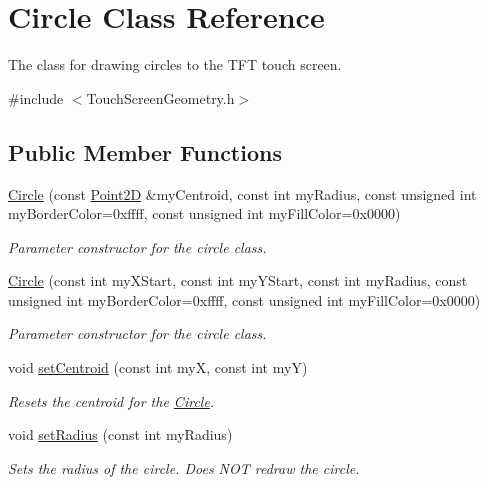 \hypertarget{class_circle}{\section{Circle Class Reference}
\label{class_circle}
}


The class for drawing circles to the T\+F\+T touch screen.  




{\ttfamily \#include $<$Touch\+Screen\+Geometry.\+h$>$}

\subsection*{Public Member Functions}
\begin{DoxyCompactItemize}
\item 
\hyperlink{class_circle_a88890d82b0634ae7c1f7395d0586d2bd}{Circle} (const \hyperlink{class_point2_d}{Point2\+D} \&my\+Centroid, const int my\+Radius, const unsigned int my\+Border\+Color=0xffff, const unsigned int my\+Fill\+Color=0x0000)
\begin{DoxyCompactList}\small\item\em Parameter constructor for the circle class. \end{DoxyCompactList}\item 
\hyperlink{class_circle_ab7a7dd06732d8519b3a2b14266952858}{Circle} (const int my\+X\+Start, const int my\+Y\+Start, const int my\+Radius, const unsigned int my\+Border\+Color=0xffff, const unsigned int my\+Fill\+Color=0x0000)
\begin{DoxyCompactList}\small\item\em Parameter constructor for the circle class. \end{DoxyCompactList}\item 
void \hyperlink{class_circle_a49e587e1199561b3dd30caa68219b845}{set\+Centroid} (const int my\+X, const int my\+Y)
\begin{DoxyCompactList}\small\item\em Resets the centroid for the \hyperlink{class_circle}{Circle}. \end{DoxyCompactList}\item 
void \hyperlink{class_circle_a2f81a4869baba24481a710bbd266c395}{set\+Radius} (const int my\+Radius)
\begin{DoxyCompactList}\small\item\em Sets the radius of the circle. Does N\+O\+T redraw the circle. \end{DoxyCompactList}\item 

\end{DoxyCompactItemize}
